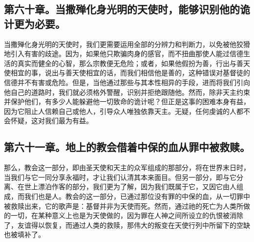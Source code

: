 
\subsection{第六十章。当撒殚化身光明的天使时，能够识别他的诡计更为必要。}

当撒殚化身光明的天使时，我们更需要运用全部的分辨力和判断力，以免被他狡猾地引入有害的歧途。\newline{}因为，如果他只欺骗肉身的感官，而不扭曲那使人能过信德生活的真实而健全的心智，那么宗教便无危险；\newline{}或者，如果他假扮为善，行出与善天使相宜的事，说出与善天使相宜的话，而我们相信他是善的，这种错误对基督徒的信德并不有害或危险。\newline{}但是，当他通过那些与其本性相异的手段，进而将我们引向他自己的道路时，我们就必须格外警醒，识别并拒绝跟随他。\newline{}然而，除非天主约束并保护他们，有多少人能躲避他一切致命的诡计呢？\newline{}但正是这事的困难本身有益，因为它阻止人信赖自己或他人，引导众人唯独依靠天主。\newline{}无疑，任何虔诚的人都不会怀疑，这对我们最为有益。\par


\subsection{第六十一章。地上的教会借着中保的血从罪中被救赎。}

那么，教会这一部分，即由圣天使和天主的众军组成的那部分，将在世界末日时，当我们与它一同分享永福时，才让我们认清其本来面目。\newline{}但另一部分，即与它分离、在世上漂泊作客的部分，我们更为了解，因为我们既属于它，又因它由人组成，而我们也是人。\newline{}教会的这一部分，已通过那位没有罪的中保的血，从一切罪中被救赎出来，它的歌声是：\newline{}基督并非为天使而死。\newline{}然而，通过祂的死亡为人类所做的一切，在某种意义上也是为天使做的，因为罪在人神之间所设立的仇恨被消除了，友谊得以恢复，而通过人类的救赎，那伟大的叛变在天使行列中所留下的空缺也被填补了。\par

